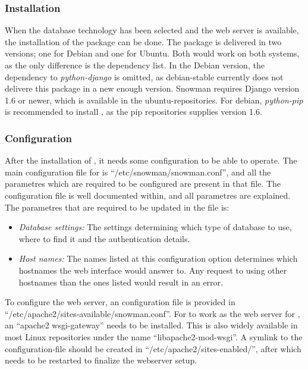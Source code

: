 \subsubsection{Installation}

When the database technology has been selected and the web server is available,
the installation of the \snowman{} package can be done. The package is delivered in
two versions; one for Debian and one for Ubuntu. Both would work on both
systems, as the only difference is the dependency list. In the Debian version,
the dependency to {\em python-django} is omitted, as debian-stable currently
does not delivere this package in a new enough version. Snowman requires Django
version 1.6 or newer, which is available in the ubuntu-repositories. For debian,
{\em python-pip} is recommended to install \django{}, as the pip repositories
supplies version 1.6.

\subsubsection{Configuration}

After the installation of \snowman{}, it needs some configuration to be able to
operate. The main configuration file for \snowman{} is
``/etc/snowman/snowman.conf'', and all the parametres which are required to be
configured are present in that file. The configuration file is well documented
within, and all parametres are explained. The parametres that are required to be
updated in the file is:
\begin{itemize}
  \item{\em Database settings:} The settings determining which type of database
  to use, where to find it and the authentication details. 
  \item{\em Host names:} The names listed at this configuration option
  determines which hostnames the \snowman{} web interface would answer to. Any
  request to \snowman{} using other hostnames than the ones listed would result in
  an error.
\end{itemize}

To configure the web server, an \apache{} configuration file is provided in
``/etc/apache2/sites-available/snowman.conf''. For \apache{} to work as the
web server for \snowman{}, an ``apache2 wsgi-gateway'' needs to be installed. This
is also widely available in most Linux repositories under the name
``libapache2-mod-wsgi''. A symlink to the configuration-file should be created
in ``/etc/apache2/sites-enabled/'', after which \apache{} needs to be restarted
to finalize the webserver setup.


